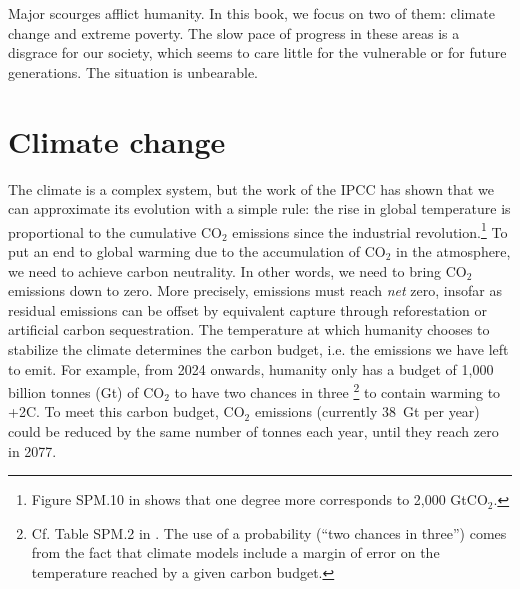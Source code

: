 \documentclass[a5paper,english,openany]{memoir}
\begin{document}
Major scourges afflict humanity. In this book, we focus on two of them: climate change and extreme poverty. The slow pace of progress in these areas is a disgrace for our society, which seems to care little for the vulnerable or for future generations. The situation is unbearable.

\section{Climate change}

The climate is a complex system, but the work of the IPCC has shown that we can approximate its evolution with a simple rule: the rise in global temperature is proportional to the cumulative CO$_\text{2}$ emissions since the industrial revolution.\footnote{Figure SPM.10 in \citet{ipcc_climate_2021} shows that one degree more corresponds to 2,000 GtCO$_\text{2}$.} 
To put an end to global warming due to the accumulation of CO$_\text{2}$ in the atmosphere, we need to achieve carbon neutrality. In other words, we need to bring CO$_\text{2}$ emissions down to zero. More precisely, emissions must reach \textit{net} zero, insofar as residual emissions can be offset by equivalent capture through reforestation or artificial carbon sequestration. The temperature at which humanity chooses to stabilize the climate determines the carbon budget, i.e. the emissions we have left to emit. For example, from 2024 onwards, humanity only has a budget of 1,000 billion tonnes (Gt) of CO$_\text{2}$ to have two chances in three%
\footnote{Cf. Table SPM.2 in \citet{ipcc_climate_2021}. The use of a probability (``two chances in three'') comes from the fact that climate models include a margin of error on the temperature reached by a given carbon budget.} to contain warming to +2\textdegree{}C. 
To meet this carbon budget, CO$_\text{2}$ emissions (currently 38~Gt per year) could be reduced by the same number of tonnes each year, until they reach zero in 2077.  %
\end{document}
